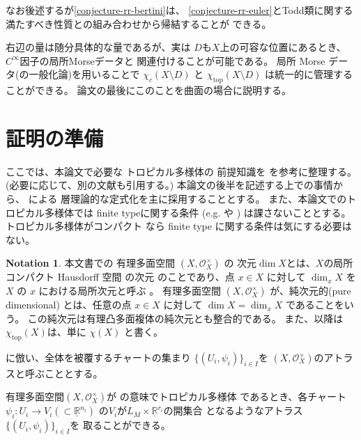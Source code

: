 \documentclass[a4paper,dvipdfmx,reqno,12pt]{amsart}
\theoremstyle{definition}
\newtheorem{notation}[theorem]{Notation}
\newcommand{\opn}[1]{\operatorname{#1}}
\numberwithin{equation}{section}
\begin{document}
なお後述するが\cref{conjecture-rr-bertini}は、
\cref{conjecture-rr-euler}とTodd類に関する
満たすべき性質との組み合わせから帰結することが
できる。

右辺の量は随分具体的な量であるが、実は
$D$も$X$上の可容な位置にあるとき、
$C^{\infty}$因子の局所Morseデータと
関連付けることが可能である。
局所 Morse データ(の一般化論)を用いることで
$\chi_c(X\setminus D)$ と
$\chi_{\mathrm{top}}(X\setminus D)$
は統一的に管理することができる。
論文の最後にこのことを曲面の場合に説明する。

\section{証明の準備}

ここでは、本論文で必要な
トロピカル多様体の
前提知識を
\cite{mikhalkin2018tropical,gross2019sheaftheoretic,demedrano2023chern}
を参考に整理する。
(必要に応じて、別の文献も引用する。)
本論文の後半を記述する上での事情から、
\cite{gross2019sheaftheoretic}による
層理論的な定式化を主に採用することとする。
また、本論文でのトロピカル多様体では
finite typeに関する条件
(e.g. \cite[Definition 7.1.14]{mikhalkin2018tropical} や
\cite[Definition 2.3 (4)]{demedrano2023chern})
は課さないこととする。トロピカル多様体がコンパクト
なら finite type に関する条件は気にする必要はない。

\begin{notation}
本文書での
有理多面空間 $(X,\mathcal{O}_X^{\times})$ の
次元$\dim X$とは、$X$の局所コンパクト Hausdorff 空間
の次元\cite[Chapter III. Definition 9.4]{MR842190}
のことであり、点 $x\in X$ に対して
$\dim_x X$ を $X$ の $x$ における局所次元と呼ぶ
\cite[Chapter III. Definition 9.10]{MR842190}。
有理多面空間
$(X,\mathcal{O}_X^{\times})$
が、純次元的(pure dimensional)
とは、任意の点 $x\in X$ に対して
$\dim X=\dim_x X$ であることをいう。
この純次元は有理凸多面複体の純次元とも整合的である。
また、以降は
$\chi_{\opn{top}}(X)$は、単に
$\chi(X)$ と書く。
\end{notation}

\cite{demedrano2023chern}に倣い、全体を被覆するチャートの集まり
$\{(U_i,\psi_i)\}_{i\in I}$を
$(X,\mathcal{O}_X^{\times})$のアトラスと呼ぶこととする。

有理多面空間$(X,\mathcal{O}_X^{\times})$が
\cite[Definition 6.1]{gross2019sheaftheoretic}の意味でトロピカル多様体
であるとき、各チャート
$\psi_i\colon U_i\to V_i(\subset \underline{\mathbb{R}}^{n_i})$
の$V_i$が$L_M\times \underline{\mathbb{R}}^{r_i}$の開集合
となるようなアトラス$\{(U_i,\psi_i)\}_{i\in I}$を
取ることができる。
\end{document}
